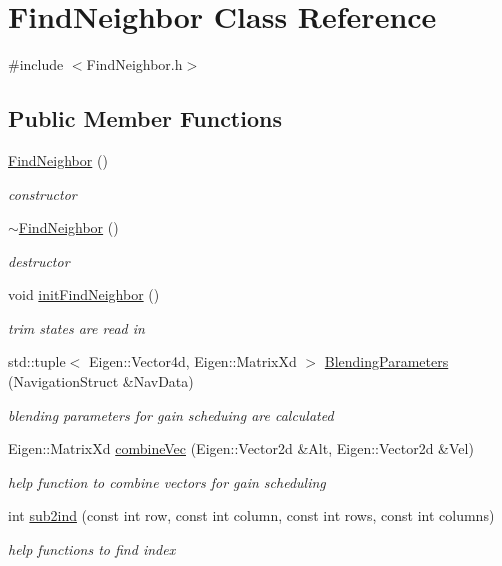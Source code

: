 \hypertarget{class_find_neighbor}{}\section{Find\+Neighbor Class Reference}
\label{class_find_neighbor}


{\ttfamily \#include $<$Find\+Neighbor.\+h$>$}

\subsection*{Public Member Functions}
\begin{DoxyCompactItemize}
\item 
\hyperlink{class_find_neighbor_a6cea2007d84dfd0f58abb178c9407326}{Find\+Neighbor} ()
\begin{DoxyCompactList}\small\item\em constructor \end{DoxyCompactList}\item 
\hyperlink{class_find_neighbor_ab137730242367d03b09da870e3537192}{$\sim$\+Find\+Neighbor} ()
\begin{DoxyCompactList}\small\item\em destructor \end{DoxyCompactList}\item 
void \hyperlink{class_find_neighbor_a749dad6095d8e0e62dd5ba11abdd7500}{init\+Find\+Neighbor} ()
\begin{DoxyCompactList}\small\item\em trim states are read in \end{DoxyCompactList}\item 
std\+::tuple$<$ Eigen\+::\+Vector4d, Eigen\+::\+Matrix\+Xd $>$ \hyperlink{class_find_neighbor_a27221e3b251af3c4e7ccccb660d412ea}{Blending\+Parameters} (Navigation\+Struct \&Nav\+Data)
\begin{DoxyCompactList}\small\item\em blending parameters for gain scheduing are calculated \end{DoxyCompactList}\item 
Eigen\+::\+Matrix\+Xd \hyperlink{class_find_neighbor_ac0133668987495831b577fefb8bdca50}{combine\+Vec} (Eigen\+::\+Vector2d \&Alt, Eigen\+::\+Vector2d \&Vel)
\begin{DoxyCompactList}\small\item\em help function to combine vectors for gain scheduling \end{DoxyCompactList}\item 
int \hyperlink{class_find_neighbor_a83acfbd061084dd8e8fa6e1ceaabab52}{sub2ind} (const int row, const int column, const int rows, const int columns)
\begin{DoxyCompactList}\small\item\em help functions to find index \end{DoxyCompactList}\end{DoxyCompactItemize}


